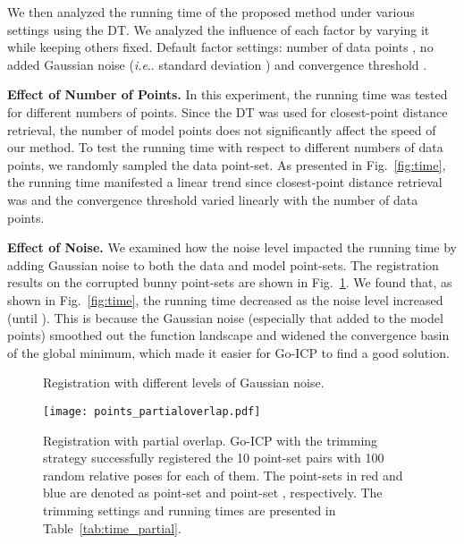 \documentclass[10pt,journal,cspaper,compsoc]{IEEEtran}
\makeatletter
\DeclareRobustCommand\onedot{\futurelet\@let@token\@onedot}
\def\@onedot{\ifx\@let@token.\else.\null\fi\xspace}
\def\ie{\emph{i.e}\onedot} \def\Ie{\emph{I.e}\onedot}
\makeatother
\begin{document}
We then analyzed the running time of the proposed method under various settings using the DT. We analyzed the influence of each factor by varying it while keeping others fixed. Default factor settings: number of data points , no added Gaussian noise (\ie standard deviation ) and convergence threshold .

\vspace{0.00in}
\noindent\textbf{Effect of Number of Points.} In this experiment, the running time was tested for different numbers of points. Since the DT was used for closest-point distance retrieval, the number of model points does not significantly affect the speed of our method. To test the running time with respect to different numbers of data points, we randomly sampled the data point-set. As presented in Fig.~\ref{fig:time}, the running time manifested a linear trend since closest-point distance retrieval was  and the convergence threshold varied linearly with the number of data points.

\vspace{0.05in}
\noindent\textbf{Effect of Noise.} We examined how the noise level impacted the running time by adding Gaussian noise to both the data and model point-sets. The registration results on the corrupted bunny point-sets are shown in Fig.~\ref{fig:reg_noise}. We found that, as shown in Fig.~\ref{fig:time},  the running time decreased as the noise level increased (until ). This is because the Gaussian noise (especially that added to the model points) smoothed out the function landscape and widened the convergence basin of the global minimum, which made it easier for Go-ICP to find a good solution.

\renewcommand*{\thesubfigure}{}
\begin{figure}[!t]
\begin{center}
\captionsetup[subfigure]{labelformat=empty}
\!\!\!
\!\!\!
\!\!\!
\vspace{-4pt}
\caption{Registration with different levels of Gaussian noise.
\label{fig:reg_noise}}
\end{center}
\vspace{-9pt}
\end{figure}
\renewcommand*{\thesubfigure}{(\alph{subfigure})}

\begin{figure*}[!t]
\begin{center}
\texttt{[image: points\_partialoverlap.pdf]}
\caption{Registration with partial overlap. Go-ICP with the trimming strategy successfully registered the 10 point-set pairs with 100 random relative poses for each of them. The point-sets in red and blue are denoted as point-set  and point-set , respectively. The trimming settings and running times are presented in Table~\ref{tab:time_partial}.
\label{fig:partialoverlap}}
\end{center}
\vspace{-2pt}
\end{figure*}
\end{document}
